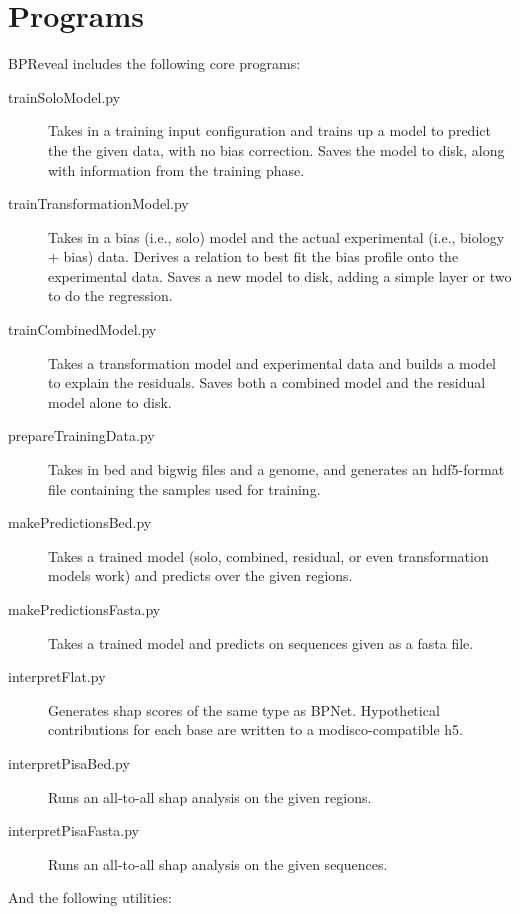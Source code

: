 \documentclass{article}
\begin{document}
\newpage

\section{Programs}

BPReveal includes the following core programs:

\begin{description}
    \item [trainSoloModel.py] Takes in a training input configuration and trains up a model to predict the the given data, with no bias correction. Saves the model to disk, along with information from the training phase.
    \item [trainTransformationModel.py] Takes in a bias (i.e., solo) model and the actual experimental (i.e., biology + bias) data. Derives a relation to best fit the bias profile onto the experimental data. Saves a new model to disk, adding a simple layer or two to do the regression.
    \item [trainCombinedModel.py] Takes a transformation model and experimental data and builds a model to explain the residuals. Saves both a combined model and the residual model alone to disk.
    \item [prepareTrainingData.py] Takes in bed and bigwig files and a genome, and generates an hdf5-format file containing the samples used for training.
    \item [makePredictionsBed.py] Takes a trained model (solo, combined, residual, or even transformation models work) and predicts over the given regions.
    \item [makePredictionsFasta.py] Takes a trained model and predicts on sequences given as a fasta file.
    \item [interpretFlat.py] Generates shap scores of the same type as BPNet. Hypothetical contributions for each base are written to a modisco-compatible h5.
    \item [interpretPisaBed.py] Runs an all-to-all shap analysis on the given regions.
    \item [interpretPisaFasta.py] Runs an all-to-all shap analysis on the given sequences.
\end{description}

And the following utilities:
\end{document}
